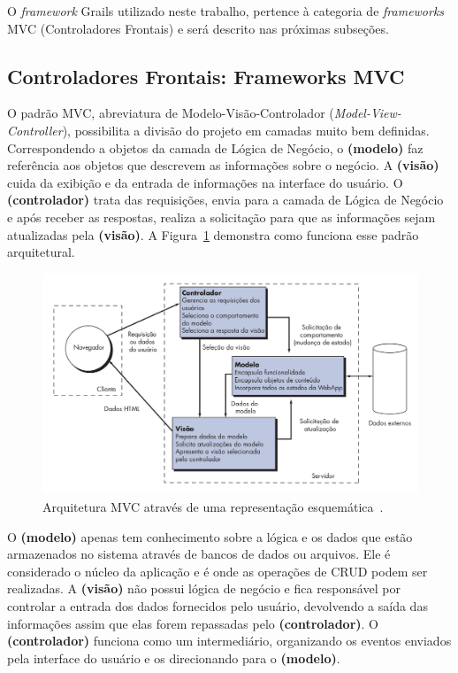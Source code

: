 O \textit{framework} Grails utilizado neste trabalho, pertence à categoria de \textit{frameworks} MVC (Controladores Frontais) e será descrito nas próximas subseções.

\subsection{Controladores Frontais: Frameworks MVC}
\label{sec-ref-framework-mvc}

O padrão MVC, abreviatura de Modelo-Visão-Controlador (\textit{Model-View-Controller}), possibilita a divisão do projeto em camadas muito bem definidas. Correspondendo a objetos da camada de Lógica de Negócio, o \textbf{(modelo)} faz referência aos objetos que descrevem as informações sobre o negócio. A \textbf{(visão)} cuida da exibição e da entrada de informações na interface do usuário. O \textbf{(controlador)} trata das requisições, envia para a camada de Lógica de Negócio e após receber as respostas, realiza a solicitação para que as informações sejam atualizadas pela \textbf{(visão)}. A Figura~\ref{fig-ref-mvc} demonstra como funciona esse padrão arquitetural.  

\begin{figure}[h]
	\centering
	\includegraphics[scale=.45]{figuras/fig-ref-mvc} 
	\caption{Arquitetura MVC através de uma representação esquemática~\cite{pressman:es11}.}
	\label{fig-ref-mvc}
\end{figure}

O \textbf{(modelo)} apenas tem conhecimento sobre a lógica e os dados que estão armazenados no sistema através de bancos de dados ou arquivos. Ele é considerado o núcleo da aplicação e é onde as operações de CRUD podem ser realizadas. A \textbf{(visão)} não possui lógica de negócio e fica responsável por controlar a entrada dos dados fornecidos pelo usuário, devolvendo a saída das informações assim que elas forem repassadas pelo \textbf{(controlador)}. O \textbf{(controlador)} funciona como um intermediário, organizando os eventos enviados pela interface do usuário e os direcionando para o \textbf{(modelo)}.

